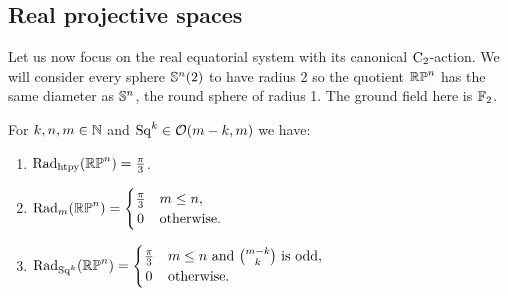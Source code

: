 
\subsection{Real projective spaces}\label{s:critical_radii_rpn}

Let us now focus on the real equatorial system with its canonical \(\mathrm{C}_2\)-action.
We will consider every sphere \(\mathbb{S}^n(2)\) to have radius 2 so the quotient \(\mathbb{RP}^n\) has the same diameter as \(\mathbb{S}^n\), the round sphere of radius 1.
The ground field here is \({\mathbb{F}_2}\).

\lemma
For \(k,n,m \in \mathbb{N}\) and \(\mathrm{Sq}^k \in \mathcal{O}(m-k, m)\) we have:
\begin{enumerate}
	\item \(\mathrm{Rad}_{\mathrm{htpy}}(\mathbb{RP}^n) = \frac{\pi}{3}\).
	\item \(\firstdeath{m}{\rp^n} =
	\begin{cases}
		\frac{\pi}{3} & m \leq n, \\
		\hfil 0 & \text{otherwise}.
	\end{cases}\)
	\item \(\firstdeath{\Sq^k}{\rp^n} =
	\begin{cases}
		\tfrac{\pi}{3} & m \leq n \text{ and } \binom{m-k}{k} \text{ is odd},\\
		\hfil 0 & \text{otherwise}. \\
	\end{cases}\)
\end{enumerate}

